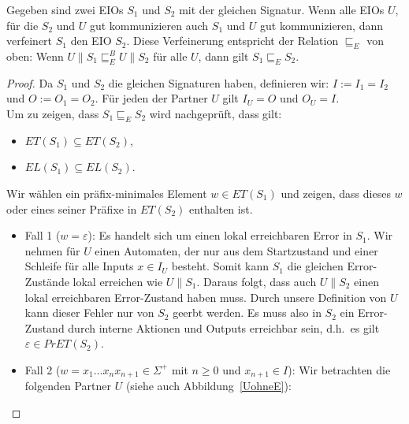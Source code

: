 \begin{lem}
  \label{lemVerfeinerung}
  Gegeben sind zwei EIOs $S_1$ und $S_2$ mit der gleichen Signatur. Wenn alle
  EIOs $U$, für die $S_2$ und $U$ gut kommunizieren auch $S_1$
  und $U$ gut kommunizieren, dann verfeinert $S_1$ den EIO $S_2$. Diese Verfeinerung
  entspricht der Relation $\sqsubseteq _E$ von oben: Wenn $U\|S_1 \sqsubseteq
  _E^B U\|S_2$ für alle $U$, dann gilt $S_1\sqsubseteq _E S_2$.
\end{lem}

\begin{proof}
  Da $S_1$ und $S_2$ die gleichen Signaturen haben, definieren wir:
  $I:=I_1=I_2$ und $O:=O_1=O_2$. Für jeden der Partner $U$ gilt $I_U=O$ und
  $O_U=I$.\\
  Um zu zeigen, dass $S_1\sqsubseteq _E S_2$ wird nachgeprüft, dass gilt:
  \begin{itemize}
    \item $ET(S_1)\subseteq ET(S_2)$,
    \item $EL(S_1)\subseteq EL(S_2)$.
  \end{itemize}
  Wir wählen ein präfix-minimales Element $w\in ET(S_1)$ und
  zeigen, dass dieses $w$ oder eines seiner Präfixe in $ET(S_2)$ enthalten ist.
  \begin{itemize}
    \item Fall 1 ($w=\varepsilon$): Es handelt sich um einen lokal erreichbaren
      Error in $S_1$.
      Wir nehmen für $U$ einen Automaten, der nur aus dem Startzustand und
      einer Schleife für alle Inputs $x\in I_U$ besteht. Somit kann $S_1$ die gleichen
      Error-Zustände lokal erreichen wie $U\|S_1$. Daraus folgt, dass auch
      $U\|S_2$ einen lokal erreichbaren Error-Zustand haben muss. Durch unsere
      Definition von $U$ kann dieser Fehler nur von $S_2$ geerbt werden. Es
      muss also in $S_2$ ein Error-Zustand durch interne Aktionen und Outputs
      erreichbar sein, d.h.\ es gilt $\varepsilon\in PrET(S_2)$.
    \item Fall 2 ($w=x_1\dots x_n x_{n+1}\in\Sigma ^+$ mit $n\geq 0$ und
      $x_{n+1}\in I$): Wir betrachten die folgenden Partner $U$ (siehe auch
      Abbildung~\ref{UohneE}):
\end{itemize}
\end{proof}
